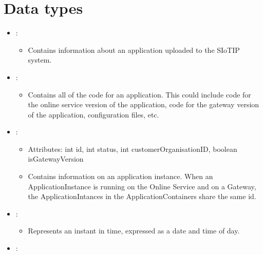 \section{Data types}\label{sec:datatypes}
\begin{itemize}[nolistsep,noitemsep]
\item {}: 
\begin{itemize}[noitemsep,nolistsep]

\item[] Contains information about an application uploaded to the SIoTIP system.
\end{itemize}
\item {}: 
\begin{itemize}[noitemsep,nolistsep]

\item[] Contains all of the code for an application. This could include code for the online service version of the application, code for the gateway version of the application, configuration files, etc.
\end{itemize}
\item {}: 
\begin{itemize}[noitemsep,nolistsep]
\item[] Attributes: int id, int status, int customerOrganisationID, boolean isGatewayVersion
\item[] Contains information on an application instance.
When an ApplicationInstance is running on the Online Service and on a Gateway, the ApplicationIntances in the ApplicationContainers share the same id.
\end{itemize}
\item {}: 
\begin{itemize}[noitemsep,nolistsep]

\item[] Represents an instant in time, expressed as a date and time of day.
\end{itemize}
\item {}: 
\begin{itemize}


\end{itemize}
\end{itemize}

